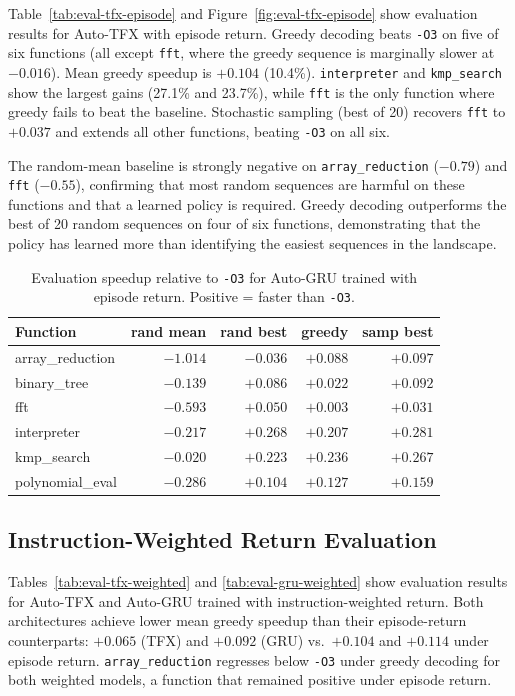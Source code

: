 \documentclass[conference]{IEEEtran}
\newcommand{\opt}[1]{\texttt{-O#1}}
\begin{document}
Table~\ref{tab:eval-tfx-episode} and Figure~\ref{fig:eval-tfx-episode}
show evaluation results for Auto-TFX with episode return.
Greedy decoding beats \opt{3} on five of six functions (all except
\texttt{fft}, where the greedy sequence is marginally slower at $-0.016$).
Mean greedy speedup is $+0.104$ (10.4\%).
\texttt{interpreter} and \texttt{kmp\_search} show the largest gains
(27.1\% and 23.7\%), while \texttt{fft} is the only function where greedy
fails to beat the baseline.
Stochastic sampling (best of 20) recovers \texttt{fft} to $+0.037$ and
extends all other functions, beating \opt{3} on all six.

The random-mean baseline is strongly negative on \texttt{array\_reduction}
($-0.79$) and \texttt{fft} ($-0.55$), confirming that most random sequences
are harmful on these functions and that a learned policy is required.
Greedy decoding outperforms the best of 20 random sequences on four of six
functions, demonstrating that the policy has learned more than identifying the
easiest sequences in the landscape.

\begin{table}[t]
\caption{Evaluation speedup relative to \opt{3} for Auto-GRU trained with
episode return. Positive = faster than \opt{3}.}
\label{tab:eval-gru-episode}
\centering
\setlength{\tabcolsep}{4pt}
\begin{tabular}{lrrrr}
\toprule
Function & rand mean & rand best & greedy & samp best \\
\midrule
array\_reduction & $-1.014$ & $-0.036$ & $+0.088$ & $+0.097$ \\
binary\_tree     & $-0.139$ & $+0.086$ & $+0.022$ & $+0.092$ \\
fft              & $-0.593$ & $+0.050$ & $+0.003$ & $+0.031$ \\
interpreter      & $-0.217$ & $+0.268$ & $+0.207$ & $+0.281$ \\
kmp\_search      & $-0.020$ & $+0.223$ & $+0.236$ & $+0.267$ \\
polynomial\_eval & $-0.286$ & $+0.104$ & $+0.127$ & $+0.159$ \\
\bottomrule
\end{tabular}
\end{table}

\subsection{Instruction-Weighted Return Evaluation}

Tables~\ref{tab:eval-tfx-weighted} and \ref{tab:eval-gru-weighted} show
evaluation results for Auto-TFX and Auto-GRU trained with instruction-weighted
return.
Both architectures achieve lower mean greedy speedup than their episode-return
counterparts: $+0.065$ (TFX) and $+0.092$ (GRU) vs.\ $+0.104$ and $+0.114$
under episode return.
\texttt{array\_reduction} regresses below \opt{3} under greedy decoding for
both weighted models, a function that remained positive under episode return.
\end{document}
